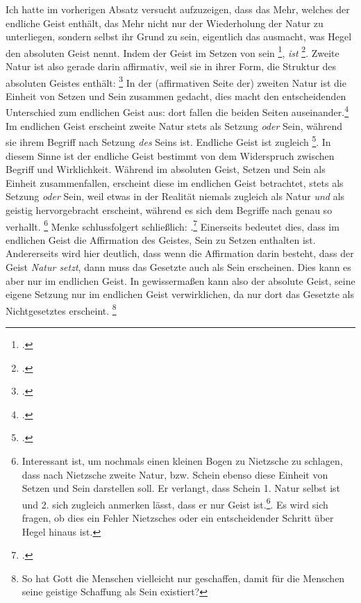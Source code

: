 \documentclass[12pt, a4paper, openany]{report}
\begin{document}
Ich hatte im vorherigen Absatz versucht aufzuzeigen, dass das Mehr, welches der endliche Geist enthält, das Mehr nicht nur der Wiederholung der Natur zu unterliegen, sondern selbst ihr Grund zu sein, eigentlich das ausmacht, was Hegel den absoluten Geist nennt.
Indem der Geist im Setzen von sein \footcite[][§ 384, S. 29]{hegel_enzyklopädie_1969}, \emph{ist} \footcite[][144]{menke_autonomie_2018}.
Zweite Natur ist also gerade darin affirmativ, weil sie in ihrer Form, die Struktur des absoluten Geistes enthält: 
\footcite[][§ 384, S. 29]{hegel_enzyklopädie_1969}
In der (affirmativen Seite der) zweiten Natur ist die Einheit von Setzen und Sein zusammen gedacht, dies macht den entscheidenden Unterschied zum endlichen Geist aus: 
dort fallen die beiden Seiten auseinander.\footcite[Vgl.][S. 143 - S. 144]{menke_autonomie_2018}
Im endlichen Geist erscheint zweite Natur stets als Setzung \emph{oder} Sein, während sie ihrem Begriff nach Setzung \emph{des} Seins ist. 
Endliche Geist ist zugleich \footcite[][144]{menke_autonomie_2018}.
In diesem Sinne ist der endliche Geist bestimmt von dem Widerspruch zwischen Begriff und Wirklichkeit. 
Während im absoluten Geist, Setzen und Sein als Einheit zusammenfallen, erscheint diese im endlichen Geist betrachtet, stets als Setzung \emph{oder} Sein, weil etwas in der Realität niemals zugleich als Natur \emph{und} als geistig hervorgebracht erscheint, während es sich dem Begriffe nach genau so verhallt.
\footnote{
    Interessant ist, um nochmals einen kleinen Bogen zu Nietzsche zu schlagen, dass nach Nietzsche zweite Natur, bzw. Schein ebenso diese Einheit von Setzen und Sein darstellen soll.
    Er verlangt, dass Schein 1. Natur selbst ist und 2. sich zugleich anmerken lässt, dass er nur Geist ist.\footcite[Vgl.][§ 54, S. 417]{nietzsche_morgenrote_1999}. 
    Es wird sich fragen, ob dies ein Fehler Nietzsches oder ein entscheidender Schritt über Hegel hinaus ist.
}
Menke schlussfolgert schließlich: 
.\footcite[][144]{menke_autonomie_2018}
Einerseits bedeutet dies, dass im endlichen Geist die Affirmation des Geistes, Sein zu Setzen enthalten ist.
Andererseits wird hier deutlich, dass wenn die Affirmation darin besteht, dass der Geist \emph{Natur setzt}, dann muss das Gesetzte auch als Sein erscheinen.
Dies kann es aber nur im endlichen Geist.
In gewissermaßen kann also der absolute Geist, seine eigene Setzung nur im endlichen Geist verwirklichen, da  nur dort das Gesetzte als Nichtgesetztes erscheint.
\footnote{
    So hat Gott die Menschen vielleicht nur geschaffen, damit für die Menschen seine geistige Schaffung als Sein existiert?
}
\end{document}
